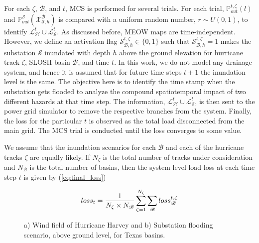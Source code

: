 For each $\zeta$, $\mathcal{B}$, and $t$, MCS is performed for several trials. For each trial, $\mathbb{P}_{out}^{t,\zeta}(l)$ and $\mathbb{P}^{\mathcal{S}}_{out}(\mathcal{X}^\mathcal{B}_{\mathcal{S}, h})$ is compared with a uniform random number, $r\sim U(0,1)$, to identify $\mathcal{L}^t_\mathcal{H} \cup \mathcal{L}^t_\mathcal{S}$. As discussed before, MEOW maps are time-independent. However, we define an activation flag $\mathcal{S}^{t, \zeta}_{\mathcal{B}, h} \in \{0,1\}$ such that $\mathcal{S}^{t, \zeta}_{\mathcal{B},h} = 1$ makes the substation $\mathcal{S}$ inundated with depth $h$ above the ground elevation for hurricane track $\zeta$, SLOSH basin $\mathcal{B}$, and time $t$. In this work, we do not model any drainage system, and hence it is assumed that for future time steps $t+1$ the inundation level is the same. The objective here is to identify the time stamp when the substation gets flooded to analyze the compound spatiotemporal impact of two different hazards at that time step. The information, $\mathcal{L}^t_\mathcal{H} \cup \mathcal{L}^t_\mathcal{S}$, is then sent to the power grid simulator to remove the respective branches from the system. Finally, the loss for the particular $t$ is observed as the total load disconnected from the main grid. The MCS trial is conducted until the loss converges to some value.

We assume that the inundation scenarios for each $\mathcal{B}$ and each of the hurricane tracks $\zeta$ are equally likely. If $N_\zeta$ is the total number of tracks under consideration and $N_\mathcal{B}$ is the total number of basins, then the system level load loss at each time step $t$ is given by (\ref{eq:final_loss})

\begin{equation}
\small
    loss_t = \frac{1}{N_\zeta \times N_\mathcal{B}}\sum_{\zeta = 1}^{N_\zeta}{\sum_{\mathcal{B}} {loss_{\mathcal{B}}^{t,\zeta}}}
    \label{eq:final_loss}
\end{equation}

\begin{figure}[!ht!]
    \centering
    \begin{subfigure}[t]{0.7\textwidth}
        \centering
        \caption{}
        \label{fig:dynamic_harvey}
    \end{subfigure}
    \begin{subfigure}[t]{0.7\textwidth}
        \centering
        \caption{}
        \label{fig:flood_scenario}
    \end{subfigure}
    \caption{a) Wind field of Hurricane Harvey and b) Substation flooding scenario, above ground level, for Texas basins.} 
    \label{fig:hurricane_flood_scenario}
\end{figure}

